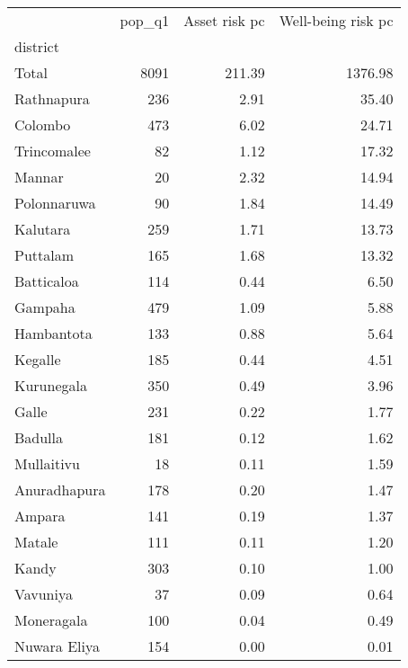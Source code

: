 \begin{tabular}{lrrr}
\toprule
{} &  pop\_q1 &  Asset risk pc &  Well-being risk pc \\
district     &         &                &                     \\
\midrule
Total        &    8091 &         211.39 &             1376.98 \\
Rathnapura   &     236 &           2.91 &               35.40 \\
Colombo      &     473 &           6.02 &               24.71 \\
Trincomalee  &      82 &           1.12 &               17.32 \\
Mannar       &      20 &           2.32 &               14.94 \\
Polonnaruwa  &      90 &           1.84 &               14.49 \\
Kalutara     &     259 &           1.71 &               13.73 \\
Puttalam     &     165 &           1.68 &               13.32 \\
Batticaloa   &     114 &           0.44 &                6.50 \\
Gampaha      &     479 &           1.09 &                5.88 \\
Hambantota   &     133 &           0.88 &                5.64 \\
Kegalle      &     185 &           0.44 &                4.51 \\
Kurunegala   &     350 &           0.49 &                3.96 \\
Galle        &     231 &           0.22 &                1.77 \\
Badulla      &     181 &           0.12 &                1.62 \\
Mullaitivu   &      18 &           0.11 &                1.59 \\
Anuradhapura &     178 &           0.20 &                1.47 \\
Ampara       &     141 &           0.19 &                1.37 \\
Matale       &     111 &           0.11 &                1.20 \\
Kandy        &     303 &           0.10 &                1.00 \\
Vavuniya     &      37 &           0.09 &                0.64 \\
Moneragala   &     100 &           0.04 &                0.49 \\
Nuwara Eliya &     154 &           0.00 &                0.01 \\
\bottomrule
\end{tabular}

